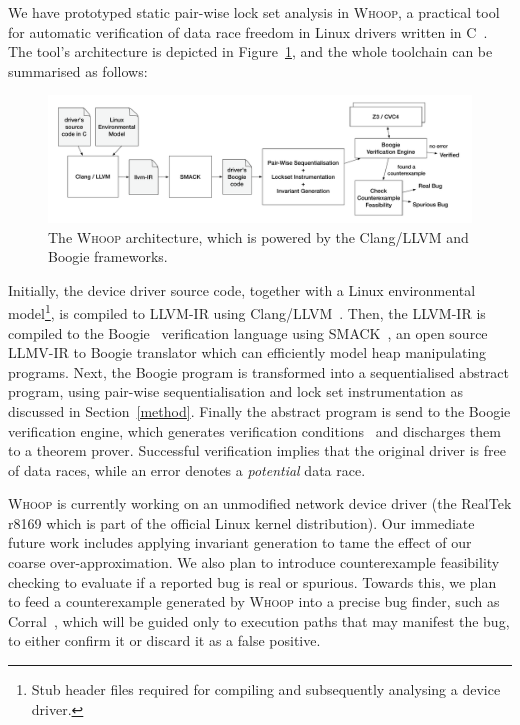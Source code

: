 We have prototyped static pair-wise lock set analysis in \textsc{Whoop}, a practical tool for automatic verification of data race freedom in Linux drivers written in C~\cite{kernighan1988c}. The tool's architecture is depicted in Figure~\ref{figure:toolchain}, and the whole toolchain can be summarised as follows:

\begin{figure}[tbp]
\centering
\includegraphics[width=.99\linewidth]{img/toolchain.pdf}
\caption{The \textsc{Whoop} architecture, which is powered by the Clang/LLVM and Boogie frameworks.}
\label{figure:toolchain}
\end{figure}

Initially, the device driver source code, together with a Linux environmental model\footnote{Stub header files required for compiling and subsequently analysing a device driver.}, is compiled to LLVM-IR using Clang/LLVM~\cite{lattner2004llvm}. Then, the LLVM-IR is compiled to the Boogie~\cite{barnett2006boogie} verification language using SMACK~\cite{rakamaric2008automatic}, an open source LLMV-IR to Boogie translator which can efficiently model heap manipulating programs. Next, the Boogie program is transformed into a sequentialised abstract program, using pair-wise sequentialisation and lock set instrumentation as discussed in Section~\ref{method}. Finally the abstract program is send to the Boogie verification engine, which generates verification conditions~\cite{barnett2005weakest} and discharges them to a theorem prover. Successful verification implies that the original driver is free of data races, while an error denotes a \emph{potential} data race.

\textsc{Whoop} is currently working on an unmodified network device driver (the RealTek r8169 which is part of the official Linux kernel distribution). Our immediate future work includes applying invariant generation to tame the effect of our coarse over-approximation. We also plan to introduce counterexample feasibility checking to evaluate if a reported bug is real or spurious. Towards this, we plan to feed a counterexample generated by \textsc{Whoop} into a precise bug finder, such as Corral~\cite{lal2012corral}, which will be guided only to execution paths that may manifest the bug, to either confirm it or discard it as a false positive.